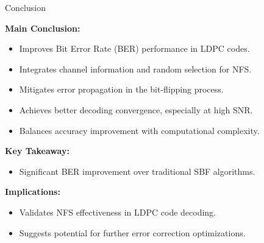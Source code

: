 \documentclass[aspectratio=169,8pt]{beamer}
\begin{document}
\begin{frame}{Conclusion}
  \centering
  \begin{minipage}{0.7\textwidth}


  \textbf{Main Conclusion:}
  \begin{itemize}
    \item Improves Bit Error Rate (BER) performance in LDPC codes.
    \item Integrates channel information and random selection for NFS.
    \item Mitigates error propagation in the bit-flipping process.
    \item Achieves better decoding convergence, especially at high SNR.
    \item Balances accuracy improvement with computational complexity.
  \end{itemize}
  \vspace{\baselineskip}
  \textbf{Key Takeaway:}
  \begin{itemize}
    \item Significant BER improvement over traditional SBF algorithms.
  \end{itemize}
  \vspace{\baselineskip}
  \textbf{Implications:}
  \begin{itemize}
    \item Validates NFS effectiveness in LDPC code decoding.
    \item Suggests potential for further error correction optimizations.
  \end{itemize}
\end{minipage}
\end{frame}
\end{document}
